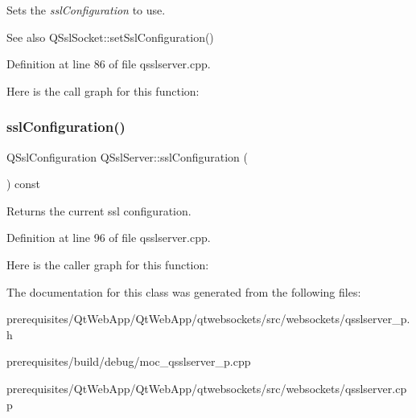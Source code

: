 Sets the {\itshape ssl\+Configuration} to use.

\begin{DoxySeeAlso}{See also}
Q\+Ssl\+Socket\+::set\+Ssl\+Configuration() 
\end{DoxySeeAlso}


Definition at line 86 of file qsslserver.\+cpp.

Here is the call graph for this function\+:
\mbox{\label{class_q_ssl_server_a5929244a54a15d3b39c4ff1bfc721f52}} 
\subsubsection{\texorpdfstring{ssl\+Configuration()}{sslConfiguration()}}
{\footnotesize\ttfamily Q\+Ssl\+Configuration Q\+Ssl\+Server\+::ssl\+Configuration (\begin{DoxyParamCaption}{ }\end{DoxyParamCaption}) const}

Returns the current ssl configuration. 

Definition at line 96 of file qsslserver.\+cpp.

Here is the caller graph for this function\+:


The documentation for this class was generated from the following files\+:\begin{DoxyCompactItemize}
\item 
prerequisites/\+Qt\+Web\+App/\+Qt\+Web\+App/qtwebsockets/src/websockets/qsslserver\+\_\+p.\+h\item 
prerequisites/build/debug/moc\+\_\+qsslserver\+\_\+p.\+cpp\item 
prerequisites/\+Qt\+Web\+App/\+Qt\+Web\+App/qtwebsockets/src/websockets/qsslserver.\+cpp\end{DoxyCompactItemize}
